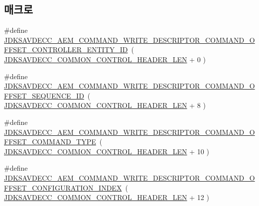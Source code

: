 \subsection*{매크로}
\begin{DoxyCompactItemize}
\item 
\#define \hyperlink{group__command__write__descriptor_ga9f29160d47620f034ef8d3937598a10c}{J\+D\+K\+S\+A\+V\+D\+E\+C\+C\+\_\+\+A\+E\+M\+\_\+\+C\+O\+M\+M\+A\+N\+D\+\_\+\+W\+R\+I\+T\+E\+\_\+\+D\+E\+S\+C\+R\+I\+P\+T\+O\+R\+\_\+\+C\+O\+M\+M\+A\+N\+D\+\_\+\+O\+F\+F\+S\+E\+T\+\_\+\+C\+O\+N\+T\+R\+O\+L\+L\+E\+R\+\_\+\+E\+N\+T\+I\+T\+Y\+\_\+\+ID}~( \hyperlink{group__jdksavdecc__avtp__common__control__header_gaae84052886fb1bb42f3bc5f85b741dff}{J\+D\+K\+S\+A\+V\+D\+E\+C\+C\+\_\+\+C\+O\+M\+M\+O\+N\+\_\+\+C\+O\+N\+T\+R\+O\+L\+\_\+\+H\+E\+A\+D\+E\+R\+\_\+\+L\+EN} + 0 )
\item 
\#define \hyperlink{group__command__write__descriptor_ga4a8bd945aa2128c5b2c0159e0b407512}{J\+D\+K\+S\+A\+V\+D\+E\+C\+C\+\_\+\+A\+E\+M\+\_\+\+C\+O\+M\+M\+A\+N\+D\+\_\+\+W\+R\+I\+T\+E\+\_\+\+D\+E\+S\+C\+R\+I\+P\+T\+O\+R\+\_\+\+C\+O\+M\+M\+A\+N\+D\+\_\+\+O\+F\+F\+S\+E\+T\+\_\+\+S\+E\+Q\+U\+E\+N\+C\+E\+\_\+\+ID}~( \hyperlink{group__jdksavdecc__avtp__common__control__header_gaae84052886fb1bb42f3bc5f85b741dff}{J\+D\+K\+S\+A\+V\+D\+E\+C\+C\+\_\+\+C\+O\+M\+M\+O\+N\+\_\+\+C\+O\+N\+T\+R\+O\+L\+\_\+\+H\+E\+A\+D\+E\+R\+\_\+\+L\+EN} + 8 )
\item 
\#define \hyperlink{group__command__write__descriptor_ga4254609df08201d233172273e3373ce1}{J\+D\+K\+S\+A\+V\+D\+E\+C\+C\+\_\+\+A\+E\+M\+\_\+\+C\+O\+M\+M\+A\+N\+D\+\_\+\+W\+R\+I\+T\+E\+\_\+\+D\+E\+S\+C\+R\+I\+P\+T\+O\+R\+\_\+\+C\+O\+M\+M\+A\+N\+D\+\_\+\+O\+F\+F\+S\+E\+T\+\_\+\+C\+O\+M\+M\+A\+N\+D\+\_\+\+T\+Y\+PE}~( \hyperlink{group__jdksavdecc__avtp__common__control__header_gaae84052886fb1bb42f3bc5f85b741dff}{J\+D\+K\+S\+A\+V\+D\+E\+C\+C\+\_\+\+C\+O\+M\+M\+O\+N\+\_\+\+C\+O\+N\+T\+R\+O\+L\+\_\+\+H\+E\+A\+D\+E\+R\+\_\+\+L\+EN} + 10 )
\item 
\#define \hyperlink{group__command__write__descriptor_ga9b4781033fccecd5ad99f94c5a2255c7}{J\+D\+K\+S\+A\+V\+D\+E\+C\+C\+\_\+\+A\+E\+M\+\_\+\+C\+O\+M\+M\+A\+N\+D\+\_\+\+W\+R\+I\+T\+E\+\_\+\+D\+E\+S\+C\+R\+I\+P\+T\+O\+R\+\_\+\+C\+O\+M\+M\+A\+N\+D\+\_\+\+O\+F\+F\+S\+E\+T\+\_\+\+C\+O\+N\+F\+I\+G\+U\+R\+A\+T\+I\+O\+N\+\_\+\+I\+N\+D\+EX}~( \hyperlink{group__jdksavdecc__avtp__common__control__header_gaae84052886fb1bb42f3bc5f85b741dff}{J\+D\+K\+S\+A\+V\+D\+E\+C\+C\+\_\+\+C\+O\+M\+M\+O\+N\+\_\+\+C\+O\+N\+T\+R\+O\+L\+\_\+\+H\+E\+A\+D\+E\+R\+\_\+\+L\+EN} + 12 )

\end{DoxyCompactItemize}
